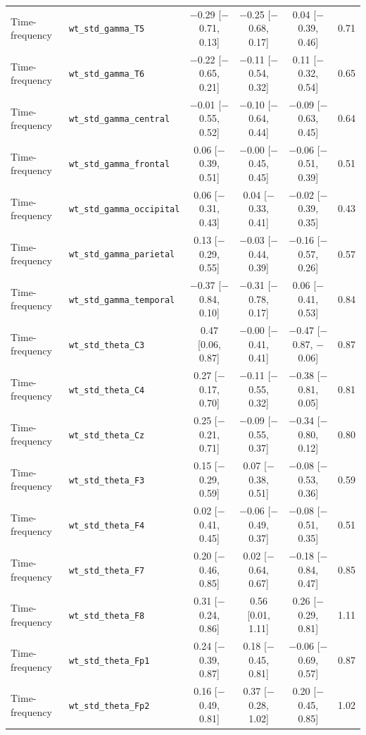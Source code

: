 {\begin{longtable}{llcccc}
Time-frequency & \texttt{wt\_std\_gamma\_T5} & $-$0.29 [$-$0.71, 0.13] & $-$0.25 [$-$0.68, 0.17] & 0.04 [$-$0.39, 0.46] & 0.71 \\
Time-frequency & \texttt{wt\_std\_gamma\_T6} & $-$0.22 [$-$0.65, 0.21] & $-$0.11 [$-$0.54, 0.32] & 0.11 [$-$0.32, 0.54] & 0.65 \\
Time-frequency & \texttt{wt\_std\_gamma\_central} & $-$0.01 [$-$0.55, 0.52] & $-$0.10 [$-$0.64, 0.44] & $-$0.09 [$-$0.63, 0.45] & 0.64 \\
Time-frequency & \texttt{wt\_std\_gamma\_frontal} & 0.06 [$-$0.39, 0.51] & $-$0.00 [$-$0.45, 0.45] & $-$0.06 [$-$0.51, 0.39] & 0.51 \\
Time-frequency & \texttt{wt\_std\_gamma\_occipital} & 0.06 [$-$0.31, 0.43] & 0.04 [$-$0.33, 0.41] & $-$0.02 [$-$0.39, 0.35] & 0.43 \\
Time-frequency & \texttt{wt\_std\_gamma\_parietal} & 0.13 [$-$0.29, 0.55] & $-$0.03 [$-$0.44, 0.39] & $-$0.16 [$-$0.57, 0.26] & 0.57 \\
Time-frequency & \texttt{wt\_std\_gamma\_temporal} & $-$0.37 [$-$0.84, 0.10] & $-$0.31 [$-$0.78, 0.17] & 0.06 [$-$0.41, 0.53] & 0.84 \\
Time-frequency & \texttt{wt\_std\_theta\_C3} & 0.47 [0.06, 0.87] & $-$0.00 [$-$0.41, 0.41] & $-$0.47 [$-$0.87, $-$0.06] & 0.87 \\
Time-frequency & \texttt{wt\_std\_theta\_C4} & 0.27 [$-$0.17, 0.70] & $-$0.11 [$-$0.55, 0.32] & $-$0.38 [$-$0.81, 0.05] & 0.81 \\
Time-frequency & \texttt{wt\_std\_theta\_Cz} & 0.25 [$-$0.21, 0.71] & $-$0.09 [$-$0.55, 0.37] & $-$0.34 [$-$0.80, 0.12] & 0.80 \\
Time-frequency & \texttt{wt\_std\_theta\_F3} & 0.15 [$-$0.29, 0.59] & 0.07 [$-$0.38, 0.51] & $-$0.08 [$-$0.53, 0.36] & 0.59 \\
Time-frequency & \texttt{wt\_std\_theta\_F4} & 0.02 [$-$0.41, 0.45] & $-$0.06 [$-$0.49, 0.37] & $-$0.08 [$-$0.51, 0.35] & 0.51 \\
Time-frequency & \texttt{wt\_std\_theta\_F7} & 0.20 [$-$0.46, 0.85] & 0.02 [$-$0.64, 0.67] & $-$0.18 [$-$0.84, 0.47] & 0.85 \\
Time-frequency & \texttt{wt\_std\_theta\_F8} & 0.31 [$-$0.24, 0.86] & 0.56 [0.01, 1.11] & 0.26 [$-$0.29, 0.81] & 1.11 \\
Time-frequency & \texttt{wt\_std\_theta\_Fp1} & 0.24 [$-$0.39, 0.87] & 0.18 [$-$0.45, 0.81] & $-$0.06 [$-$0.69, 0.57] & 0.87 \\
Time-frequency & \texttt{wt\_std\_theta\_Fp2} & 0.16 [$-$0.49, 0.81] & 0.37 [$-$0.28, 1.02] & 0.20 [$-$0.45, 0.85] & 1.02 \\

\end{longtable}}

